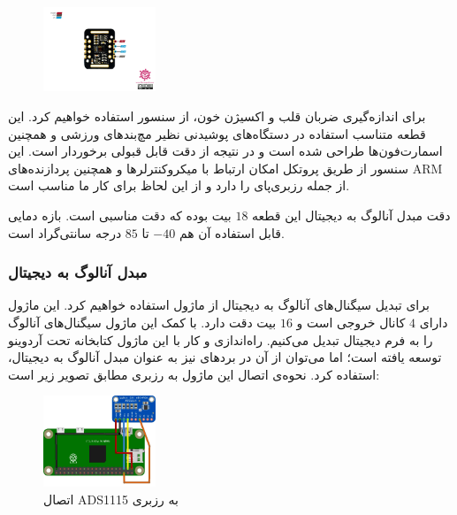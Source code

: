 \documentclass[12pt]{article}
\begin{document}
\begin{figure}[h]
	\begin{center}
		\includegraphics[width=0.3\textwidth]{max30102}
	\end{center}
	\caption{}
\end{figure}

برای اندازه‌گیری ضربان قلب و اکسیژن خون، از سنسور 
استفاده خواهیم کرد. این قطعه متناسب استفاده در دستگاه‌های پوشیدنی نظیر مچ‌بند‌های ورزشی و همچنین اسمارت‌فون‌ها طراحی شده است و در نتیجه از دقت قابل قبولی برخوردار است. این سنسور از طریق پروتکل 
امکان ارتباط با میکروکنترلرها و همچنین پردازنده‌های ARM از جمله رزبری‌پای را دارد و از این لحاظ برای کار ما مناسب است.



دقت مبدل آنالوگ به دیجیتال این قطعه $18$ بیت بوده که دقت مناسبی است. بازه دمایی قابل استفاده آن هم $-40$ تا $85$ درجه سانتی‌گراد است.

\subsubsection{مبدل آنالوگ به دیجیتال}
برای تبدیل سیگنال‌های آنالوگ به دیجیتال از ماژول
استفاده خواهیم کرد. این ماژول دارای $4$ کانال خروجی است و $16$ بیت دقت دارد. با کمک این ماژول سیگنال‌های آنالوگ را به فرم دیجیتال تبدیل می‌کنیم. راه‌اندازی و کار با این ماژول کتابخانه تحت آردوینو توسعه یافته است؛ اما می‌توان از آن در بردهای
نیز به عنوان مبدل آنالوگ به دیجیتال، استفاده کرد. نحوه‌ی اتصال این ماژول به رزبری مطابق تصویر زیر است:

\begin{figure}[h]
	\begin{center}
		\includegraphics[width=0.3\textwidth]{ADS1115_Raspberry}
	\end{center}
	\caption{اتصال ADS1115 به رزبری}
\end{figure}
\end{document}

